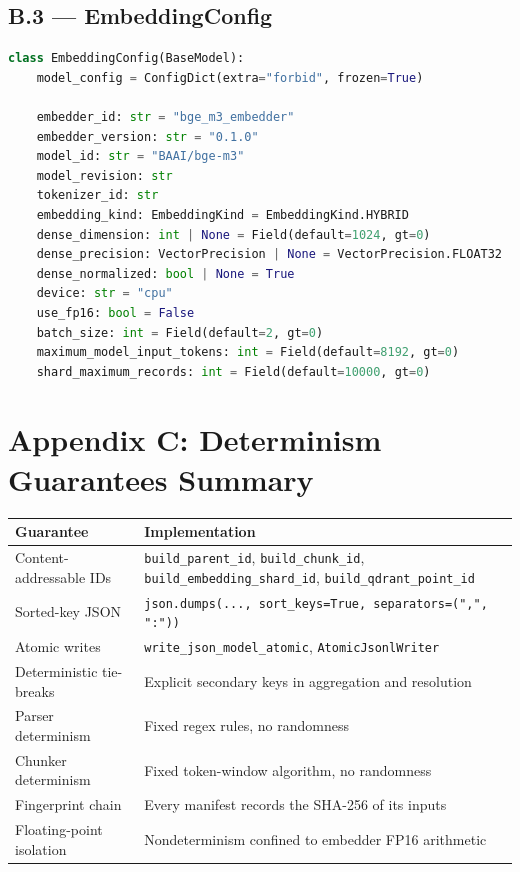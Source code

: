 \documentclass[11pt,a4paper]{article}
\begin{document}
\subsection{B.3 --- EmbeddingConfig}
\begin{lstlisting}[language=python]
class EmbeddingConfig(BaseModel):
    model_config = ConfigDict(extra="forbid", frozen=True)

    embedder_id: str = "bge_m3_embedder"
    embedder_version: str = "0.1.0"
    model_id: str = "BAAI/bge-m3"
    model_revision: str
    tokenizer_id: str
    embedding_kind: EmbeddingKind = EmbeddingKind.HYBRID
    dense_dimension: int | None = Field(default=1024, gt=0)
    dense_precision: VectorPrecision | None = VectorPrecision.FLOAT32
    dense_normalized: bool | None = True
    device: str = "cpu"
    use_fp16: bool = False
    batch_size: int = Field(default=2, gt=0)
    maximum_model_input_tokens: int = Field(default=8192, gt=0)
    shard_maximum_records: int = Field(default=10000, gt=0)
\end{lstlisting}

\section{Appendix C: Determinism Guarantees Summary}

\begin{center}
\small
\begin{tabular}{p{4cm} p{10.5cm}}
\toprule
\textbf{Guarantee} & \textbf{Implementation} \\
\midrule
Content-addressable IDs & \texttt{build\_parent\_id}, \texttt{build\_chunk\_id}, \texttt{build\_embedding\_shard\_id}, \texttt{build\_qdrant\_point\_id} \\
Sorted-key JSON & \texttt{json.dumps(..., sort\_keys=True, separators=(",", ":"))} \\
Atomic writes & \texttt{write\_json\_model\_atomic}, \texttt{AtomicJsonlWriter} \\
Deterministic tie-breaks & Explicit secondary keys in aggregation and resolution \\
Parser determinism & Fixed regex rules, no randomness \\
Chunker determinism & Fixed token-window algorithm, no randomness \\
Fingerprint chain & Every manifest records the SHA-256 of its inputs \\
Floating-point isolation & Nondeterminism confined to embedder FP16 arithmetic \\
\bottomrule
\end{tabular}
\end{center}
\end{document}
